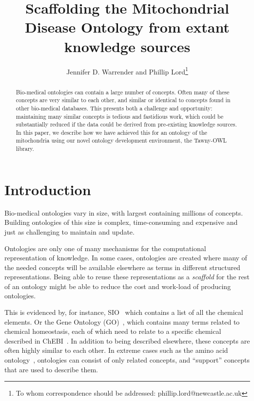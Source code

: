 \documentclass{icbo}
\newcommand{\tawny}{Tawny-OWL\xspace}
\begin{document}
\title[Scaffolding the Mitochondrial Disease Ontology]{Scaffolding the
  Mitochondrial Disease Ontology from extant knowledge sources}

\author[J. D. Warrender and P. Lord]{Jennifer D. Warrender and Phillip
  Lord\footnote{To whom correspondence should be addressed:
    phillip.lord@newcastle.ac.uk}}

\address{School of Computing Science, Newcastle University,
  Newcastle-upon-Tyne, UK}

\maketitle

\begin{abstract}
  Bio-medical ontologies can contain a large number of concepts. Often
  many of these concepts are very similar to each other, and similar
  or identical to concepts found in other bio-medical databases. This
  presents both a challenge and opportunity: maintaining many similar
  concepts is tedious and fastidious work, which could be
  substantially reduced if the data could be derived from pre-existing
  knowledge sources. In this paper, we describe how we have achieved
  this for an ontology of the mitochondria using our novel ontology
  development environment, the \tawny library.
\end{abstract}

\section{Introduction}

Bio-medical ontologies vary in size, with largest containing millions
of concepts. Building ontologies of this size is complex,
time-consuming and expensive and just as challenging to maintain and
update.

Ontologies are only one of many mechanisms for the computational
representation of knowledge. In some cases, ontologies are created
where many of the needed concepts will be available elsewhere as terms
in different structured representations. Being able to reuse these
representations as a \textit{scaffold} for the rest of an ontology
might be able to reduce the cost and work-load of producing
ontologies.

This is evidenced by, for instance, SIO~\citep{sio} which contains a
list of all the chemical elements. Or the Gene Ontology
(GO)~\citep{go}, which contains many terms related to chemical
homeostasis, each of which need to relate to a specific chemical
described in ChEBI~\citep{chebi}. In addition to being described
elsewhere, these concepts are often highly similar to each other. In
extreme cases such as the amino acid ontology~\citep{greycite9379},
ontologies can consist of only related concepts, and ``support''
concepts that are used to describe them.
\end{document}
